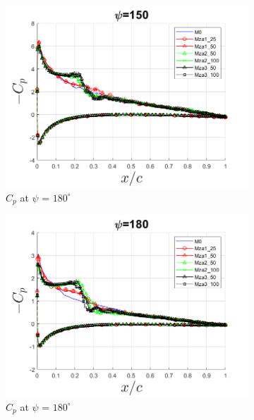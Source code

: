\begin{figure}[H]
\begin{subfigure}[b]{0.475\textwidth}
	\centering
	\includegraphics[width=1\textwidth]{figures/zonal_adapt_results/Cp/phase_150.png}
	\caption{ $C_p$ at $\psi$ = $180^\circ$}
	\label{fig:zonal_Cp_180}
\end{subfigure}
\begin{subfigure}[b]{0.475\textwidth}
\centering
\includegraphics[width=1\textwidth]{figures/zonal_adapt_results/Cp/phase_180.png}
\caption{ $C_p$ at $\psi$ = $180^\circ$}
\label{fig:zonal_Cp_180}
\end{subfigure}
\begin{subfigure}[b]{0.475\textwidth}
\centering

\end{subfigure}
\end{figure}
